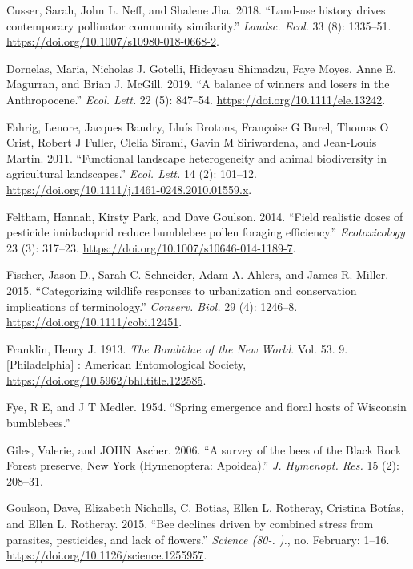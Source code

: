 \documentclass[11pt,]{article}
\begin{document}
\leavevmode\hypertarget{ref-Cusser2018}{}%
Cusser, Sarah, John L. Neff, and Shalene Jha. 2018. ``Land-use history
drives contemporary pollinator community similarity.'' \emph{Landsc.
Ecol.} 33 (8): 1335--51.
\url{https://doi.org/10.1007/s10980-018-0668-2}.

\leavevmode\hypertarget{ref-Dornelas2019}{}%
Dornelas, Maria, Nicholas J. Gotelli, Hideyasu Shimadzu, Faye Moyes,
Anne E. Magurran, and Brian J. McGill. 2019. ``A balance of winners and
losers in the Anthropocene.'' \emph{Ecol. Lett.} 22 (5): 847--54.
\url{https://doi.org/10.1111/ele.13242}.

\leavevmode\hypertarget{ref-Fahrig2011b}{}%
Fahrig, Lenore, Jacques Baudry, Lluís Brotons, Françoise G Burel, Thomas
O Crist, Robert J Fuller, Clelia Sirami, Gavin M Siriwardena, and
Jean-Louis Martin. 2011. ``Functional landscape heterogeneity and animal
biodiversity in agricultural landscapes.'' \emph{Ecol. Lett.} 14 (2):
101--12. \url{https://doi.org/10.1111/j.1461-0248.2010.01559.x}.

\leavevmode\hypertarget{ref-Feltham2014}{}%
Feltham, Hannah, Kirsty Park, and Dave Goulson. 2014. ``Field realistic
doses of pesticide imidacloprid reduce bumblebee pollen foraging
efficiency.'' \emph{Ecotoxicology} 23 (3): 317--23.
\url{https://doi.org/10.1007/s10646-014-1189-7}.

\leavevmode\hypertarget{ref-Fischer2015}{}%
Fischer, Jason D., Sarah C. Schneider, Adam A. Ahlers, and James R.
Miller. 2015. ``Categorizing wildlife responses to urbanization and
conservation implications of terminology.'' \emph{Conserv. Biol.} 29
(4): 1246--8. \url{https://doi.org/10.1111/cobi.12451}.

\leavevmode\hypertarget{ref-Franklin1913}{}%
Franklin, Henry J. 1913. \emph{The Bombidae of the New World}. Vol. 53.
9. {[}Philadelphia{]} : American Entomological Society,
\url{https://doi.org/10.5962/bhl.title.122585}.

\leavevmode\hypertarget{ref-Fye1954a}{}%
Fye, R E, and J T Medler. 1954. ``Spring emergence and floral hosts of
Wisconsin bumblebees.''

\leavevmode\hypertarget{ref-Giles2006}{}%
Giles, Valerie, and JOHN Ascher. 2006. ``A survey of the bees of the
Black Rock Forest preserve, New York (Hymenoptera: Apoidea).'' \emph{J.
Hymenopt. Res.} 15 (2): 208--31.

\leavevmode\hypertarget{ref-Goulson2015c}{}%
Goulson, Dave, Elizabeth Nicholls, C. Botias, Ellen L. Rotheray,
Cristina Botías, and Ellen L. Rotheray. 2015. ``Bee declines driven by
combined stress from parasites, pesticides, and lack of flowers.''
\emph{Science (80-. ).}, no. February: 1--16.
\url{https://doi.org/10.1126/science.1255957}.
\end{document}
